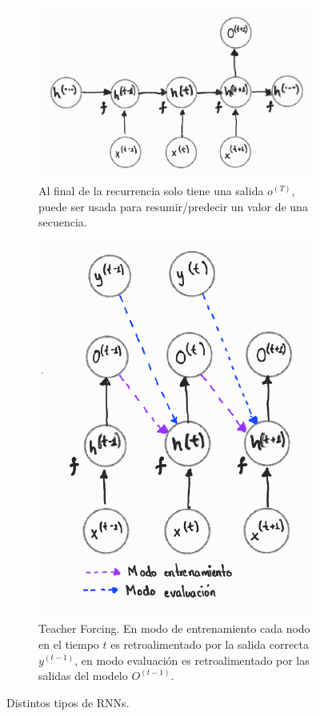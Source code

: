 \begin{figure}[!ht]
    \begin{subfigure}[b]{0.4\textwidth}
        \centering
        \includegraphics[height=0.63\textwidth]{Chapters/1. Transformer/Figures/rnn/rnn_cfgc.png}
        \caption{Al final de la recurrencia solo tiene una salida $o^{(T)}$, puede ser usada para
        resumir/predecir un valor de una secuencia.}
        \label{fig:rnn_cfgc}
    \end{subfigure}
    \hfill
    \begin{subfigure}[b]{0.49\textwidth}
        \centering
        \includegraphics[height=0.6\textwidth]{Chapters/1. Transformer/Figures/rnn/rnn_cfgd.png}
        \caption{Teacher Forcing. En modo de entrenamiento cada nodo en el tiempo $t$ es
        retroalimentado por la salida correcta $y^{(t-1)}$, en modo evaluación es retroalimentado por las
        salidas del modelo $O^{(t-1)}$.}
        \label{fig:rnn_cfgd}
    \end{subfigure}

    \caption[RNN - CFG]{Distintos tipos de RNNs.}
    \label{fig:three graphs}
\end{figure}


